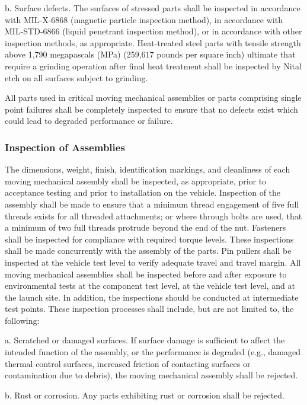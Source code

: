 \documentclass[12pt]{article}
\begin{document}
b. Surface defects. 
The surfaces of stressed parts shall be inspected in accordance with MIL-X-6868 (magnetic particle inspection method), in accordance with MIL-STD-6866 (liquid penetrant inspection method), or in accordance with other inspection methods, as appropriate. 
Heat-treated steel parts with tensile strength above 1,790 megapascals (MPa) (259,617 pounds per square inch) ultimate that require a grinding operation after final heat treatment shall be inspected by Nital etch on all surfaces subject to grinding.

All parts used in critical moving mechanical assemblies or parts comprising single point failures shall be completely inspected to ensure that no defects exist which could lead to degraded performance or failure.

\subsubsection{Inspection of Assemblies} %
The dimensions, weight, finish, identification markings, and cleanliness of each moving mechanical assembly shall be inspected, as appropriate, prior to acceptance testing and prior to installation on the vehicle.
Inspection of the assembly shall be made to ensure that a minimum thread engagement of five full threads exists for all threaded attachments; or where through bolts are used, that a minimum of two full threads protrude beyond the end of the nut.
Fasteners shall be inspected for compliance with required torque levels. 
These inspections shall be made concurrently with the assembly of the parts. 
Pin pullers shall be inspected at the vehicle test level to verify adequate travel and travel margin.
All moving mechanical assemblies shall be inspected before and after exposure to environmental tests at the component test level, at the vehicle test level, and at the launch site. 
In addition, the inspections should be conducted at intermediate test points. 
These inspection processes shall include, but are not limited to, the following:

a. Scratched or damaged surfaces. 
If surface damage is sufficient to affect the intended function of the assembly, or the performance is degraded (e.g., damaged thermal control surfaces, increased friction of contacting surfaces or contamination due to debris), the moving mechanical assembly shall be rejected.

b. Rust or corrosion.
Any parts exhibiting rust or corrosion shall be rejected.
\end{document}
